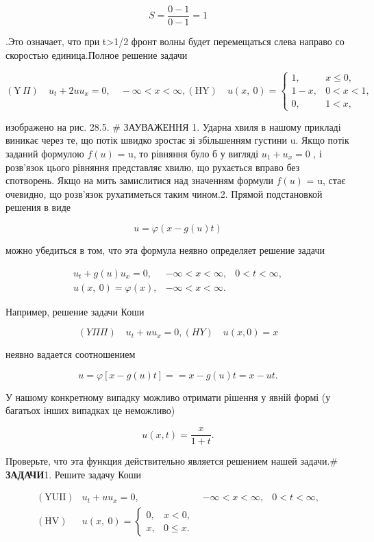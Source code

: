 \documentclass[
  ukrainian,
]{article}
\begin{document}
\[
S = \frac{0-1}{0-1} = 1
\]

.Это означает, что при t\textgreater1/2 фронт волны будет перемещаться
слева направо со скоростью единица.Полное решение задачи

\[
(\text{Y} \, \Pi) \quad u_t + 2uu_x = 0, \quad -\infty < x < \infty,
(\text{HY}) \quad u(x, \ 0) =
\begin{cases} 1, & x \leq 0, \\ 1 - x, & 0 < x < 1, \\ 0, & 1 < x, \end{cases}
\]

изображено на рис. 28.5. \# ЗАУВАЖЕННЯ 1. Ударна хвиля в нашому прикладі
виникає через те, що потік швидко зростає зі збільшенням густини u. Якщо
потік заданий формулою \(f(u)\) = u, то рівняння було б у вигляді
\(u_1+u_x=0\) , і розв'язок цього рівняння представляє хвилю, що
рухається вправо без спотворень. Якщо на мить замислитися над значенням
формули \(f(u)\) = u, стає очевидно, що розв'язок рухатиметься таким
чином.2. Прямой подстановкой решения в виде

\[
u = \varphi(x - g(u) t)
\]

можно убедиться в том, что эта формула неявно определяет решение задачи

\[
\begin{array}{lll} u_t + g\left(u\right) u_x = 0, & -\infty < x < \infty, & 0 < t < \infty, \\ u\left(x, \ 0\right) = \varphi\left(x\right), & -\infty < x < \infty. \end{array}
\]

Например, решение задачи Коши

\[
(Y\Pi\Pi) \quad u_t + uu_x = 0,
(HY) \quad u(x, 0) = x
\]

неявно вадается соотношением

\[
u = \varphi [x - g(u) t] =
= x - g(u) t = x - ut.
\]

У нашому конкретному випадку можливо отримати рішення у явній формі (у
багатьох інших випадках це неможливо)

\[
u(x, t) = \frac{x}{1+t}.
\]

Проверьте, что эта функция действительно является решением нашей
задачи.\# \textbf{ЗАДАЧИ}1. Решите задачу Коши

\[
\begin{array}{lll} (\text{YUII}) & u_t + uu_x = 0, & -\infty < x < \infty, & 0 < t < \infty, \\ (\text{HV}) & u(x, \ 0) = \begin{cases} 0, & x < 0, \\ x, & 0 \leqslant x. \end{cases} \end{array}
\]
\end{document}
